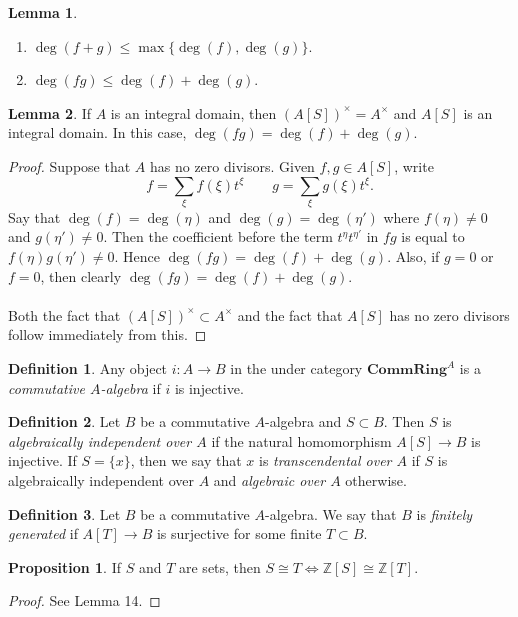 \documentclass[10pt,letterpaper,cm]{nupset}
\theoremstyle{definition}
\newtheorem*{definition}{Definition}
\newtheorem{prop}{Proposition}
\newtheorem{lemma}{Lemma}
\newcommand{\Z}{\mathbb Z}
\newcommand{\1}{\mathbf{1}}
\newcommand{\0}{\vec 0}
\begin{document}
\begin{lemma} $ $
\begin{enumerate}
\item $\deg(f+g)\leq \max \{\deg(f), \deg(g)\}$.
\item $\deg(fg) \leq \deg(f) + \deg(g)$.
\end{enumerate}
\end{lemma}

\begin{lemma}
If $A$ is an integral domain, then $(A[S])^{\times} =A^{\times}$ and $A[S]$ is an integral domain. In this case, $\deg(fg) = \deg(f) + \deg(g)$.
\end{lemma}
\begin{proof}
Suppose that $A$ has no zero divisors. Given $f,g \in A[S]$,  write 
$$ f= \sum_{\xi} f(\xi)t^{\xi}   \quad \quad  g= \sum_{\xi} g(\xi)t^{\xi}.$$ Say that $\deg(f) = \deg(\eta)$ and $\deg(g) = \deg(\eta')$ where $f(\eta) \ne 0$ and $g(\eta') \ne 0$. Then the coefficient before the term $t^{\eta}t^{\eta'}$ in $fg$ is equal to $f(\eta)g(\eta') \ne 0$. Hence $\deg(fg) = \deg(f) + \deg(g)$. Also, if $g=0$ or $f=0$, then clearly $\deg(fg) = \deg(f) + \deg(g)$.
\\ \\ 
Both the fact that $(A[S])^{\times} \subset A^{\times}$ and the fact that $A[S]$ has no zero divisors follow immediately from this.
\end{proof}

\begin{definition}
Any object $i : A \to B$ in the under category $\mathbf{CommRing}^A$ is a \textit{commutative $A$-algebra} if $i$ is injective. 
\end{definition}

\begin{definition}
Let $B$ be a commutative $A$-algebra and $S\subset B$. Then $S$ is \textit{algebraically independent over $A$} if the natural homomorphism $A[S] \to B$ is injective. If $S=\{x\}$, then we say that $x$ is \textit{transcendental over $A$} if $S$ is algebraically independent over $A$ and \textit{algebraic over $A$} otherwise.
\end{definition}

\begin{definition}
Let $B$ be a commutative $A$-algebra. We say that $B$ is \textit{finitely generated} if $A[T] \to B$ is surjective for some finite $T\subset B$.
\end{definition}

\begin{prop}
If $S$ and $T$ are sets, then $S\cong T \iff \Z[S]\cong \Z[T]$.
\end{prop}
\begin{proof}
See Lemma 14.
\end{proof}
\end{document}
